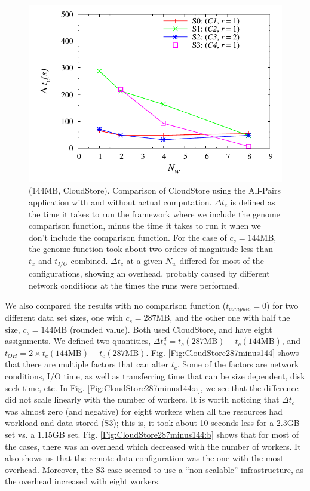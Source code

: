 \documentclass{rspublic}
\begin{document}
\begin{figure}
\begin{center}
\includegraphics[scale=0.5]{data/graphs/CloudStoreComputeMinusNoCompute144}
\caption{(144MB, CloudStore). Comparison of CloudStore using the All-Pairs application with
and without actual computation. $\Delta t_c$ is defined as the time it
takes to run the framework where we include the genome comparison
function, minus the time it takes to run it when we don't include the
comparison function. For the case of $c_s=144\mbox{MB}$, the genome function
took about two orders of magnitude less than $t_x$ and $t_{I/O}$
combined. $\Delta t_c$ at a given $N_w$ differed for most of the
configurations, showing an overhead, probably caused by different
network conditions at the times the runs were performed.}
\label{Fig:experiment4}
\end{center}
\vspace{-0.5cm}
\end{figure}

We also compared the results with no comparison function
($t_{compute}=0$) for two different data set sizes, one with $c_s =
287\mbox{MB}$, and the other one with half the size, $c_s = 144\mbox{MB}$ (rounded
value). Both used CloudStore, and have eight assignments. We defined two
quantities, $\Delta t_c^d = t_c(287\mbox{MB}) - t_c(144\mbox{MB})$, and
$t_{OH} = 2 \times t_c(144\mbox{MB}) - t_c(287\mbox{MB})$. Fig.
\ref{Fig:CloudStore287minus144} shows that there are multiple factors
that can alter $t_c$. Some of the factors are network conditions, I/O
time, as well as transferring time that can be size dependent, disk seek
time, etc. In Fig. \ref{Fig:CloudStore287minus144:a}, we see that the
difference did not scale linearly with the number of workers. It is
worth noticing that $\Delta t_c$ was almost zero (and negative) for
eight workers when all the resources had workload and data stored (S3);
this is, it took about 10 seconds less for a 2.3GB set vs. a 1.15GB
set. Fig. \ref{Fig:CloudStore287minus144:b} shows that for most of the
cases, there was an overhead which decreased with the number of workers.
It also shows us that the remote data configuration was the one with the
most overhead. Moreover, the S3 case seemed to use a ``non scalable''
infrastructure, as the overhead increased with eight workers.
\end{document}
